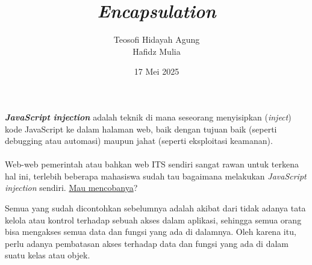 \documentclass{../praktikum-ppt}
\author[Tew \& Haf]{Teosofi Hidayah Agung \\ Hafidz Mulia}
\date{17 Mei 2025}
\title[Alpro 2 - Week 7]{\textit{Encapsulation}}
\institute[Matematika ITS]{Departemen Matematika\\ Institut Teknologi Sepuluh Nopember}
\begin{document}
{
\begin{frame}
  \titlepage
\end{frame}
}


    { 
      \begin{frame}
      \textbf{\textit{JavaScript injection}} adalah teknik di mana seseorang menyisipkan (\textit{inject}) kode JavaScript ke dalam halaman web, baik dengan tujuan baik (seperti debugging atau automasi) maupun jahat (seperti eksploitasi keamanan).\\~\\

      Web-web pemerintah atau bahkan web ITS sendiri sangat rawan untuk terkena hal ini, terlebih beberapa mahasiswa sudah tau bagaimana melakukan \textit{JavaScript injection} sendiri. \underline{Mau mencobanya}?
    \end{frame}
    
    \begin{frame}
      \begin{masalah}
        Semua yang sudah dicontohkan sebelumnya adalah akibat dari tidak adanya tata kelola atau kontrol terhadap sebuah akses dalam aplikasi, sehingga semua orang bisa mengakses semua data dan fungsi yang ada di dalamnya. Oleh karena itu, perlu adanya pembatasan akses terhadap data dan fungsi yang ada di dalam suatu kelas atau objek.
      \end{masalah}
    \end{frame}
    }
\end{document}
